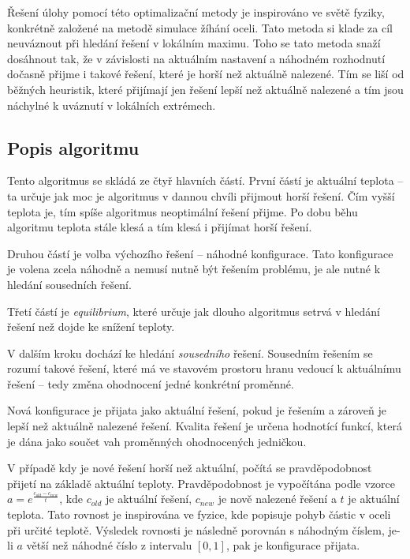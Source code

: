 \documentclass[czech]{article}
\begin{document}
Řešení úlohy pomocí této optimalizační metody je inspirováno ve světě fyziky, konkrétně založené na metodě simulace žíhání oceli.
Tato metoda si klade za cíl neuváznout při hledání řešení v lokálním maximu.
Toho se tato metoda snaží dosáhnout tak, že v závislosti na aktuálním nastavení a náhodném rozhodnutí dočasně přijme i takové řešení, které je horší než aktuálně nalezené.
Tím se liší od běžných heuristik, které přijímají jen řešení lepší než aktuálně nalezené a tím jsou náchylné k uváznutí v lokálních extrémech.

\subsection{Popis algoritmu}

Tento algoritmus se skládá ze čtyř hlavních částí.
První částí je aktuální teplota -- ta určuje jak moc je algoritmus v dannou chvíli  přijmout horší řešení.
Čím vyšší teplota je, tím spíše algoritmus neoptimální řešení přijme.
Po dobu běhu algoritmu teplota stále klesá a tím klesá i  přijímat horší řešení.

Druhou částí je volba výchozího řešení -- náhodné konfigurace.
Tato konfigurace je volena zcela náhodně a nemusí nutně být řešením problému, je ale nutné k hledání sousedních řešení.

Třetí částí je \textit{equilibrium}, které určuje jak dlouho algoritmus setrvá v hledání řešení než dojde ke snížení teploty.

V dalším kroku dochází ke hledání \textit{sousedního} řešení.
Sousedním řešením se rozumí takové řešení, které má ve stavovém prostoru hranu vedoucí k aktuálnímu řešení -- tedy změna ohodnocení jedné konkrétní proměnné.

Nová konfigurace je přijata jako aktuální řešení, pokud je řešením a zároveň je lepší než aktuálně nalezené řešení.
Kvalita řešení je určena hodnotící funkcí, která je dána jako součet vah proměnných ohodnocených jedničkou.

V případě kdy je nové řešení horší než aktuální, počítá se pravděpodobnost přijetí na základě aktuální teploty.
Pravděpodobnost je vypočítána podle vzorce $a = e^\frac{c_{old} - c_{new}}{t}$, kde $c_{old}$ je aktuální řešení, $c_{new}$ je nově nalezené řešení a $t$ je aktuální teplota.
Tato rovnost je inspirována ve fyzice, kde popisuje pohyb částic v oceli při určité teplotě.
Výsledek rovnosti je následně porovnán s náhodným číslem, je-li $a$ větší než náhodné číslo z intervalu $[0, 1]$, pak je konfigurace přijata.
\end{document}
